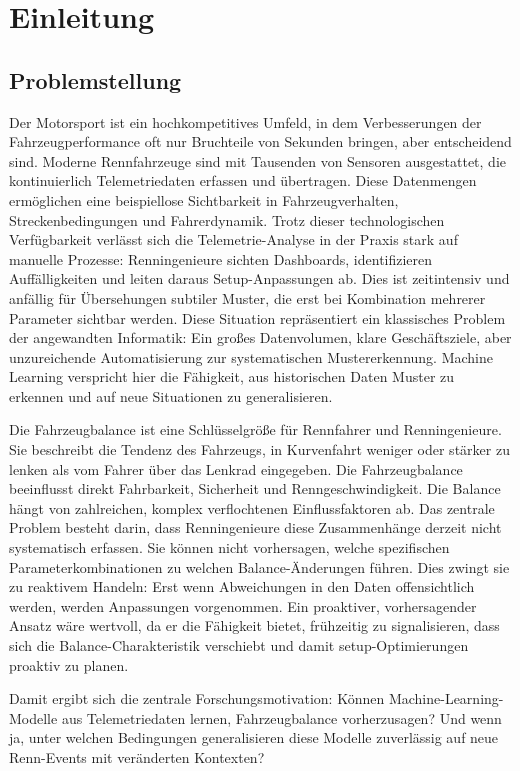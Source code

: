 \chapter{Einleitung}

\section{Problemstellung}

Der Motorsport ist ein hochkompetitives Umfeld, in dem Verbesserungen der Fahrzeugperformance oft nur Bruchteile von Sekunden bringen, aber entscheidend sind. Moderne Rennfahrzeuge sind mit Tausenden von Sensoren ausgestattet, die kontinuierlich Telemetriedaten erfassen und übertragen. Diese Datenmengen ermöglichen eine beispiellose Sichtbarkeit in Fahrzeugverhalten, Streckenbedingungen und Fahrerdynamik. Trotz dieser technologischen Verfügbarkeit verlässt sich die Telemetrie-Analyse in der Praxis stark auf manuelle Prozesse: Renningenieure sichten Dashboards, identifizieren Auffälligkeiten und leiten daraus Setup-Anpassungen ab. Dies ist zeitintensiv und anfällig für Übersehungen subtiler Muster, die erst bei Kombination mehrerer Parameter sichtbar werden.
Diese Situation repräsentiert ein klassisches Problem der angewandten Informatik: Ein großes Datenvolumen, klare Geschäftsziele, aber unzureichende Automatisierung zur systematischen Mustererkennung. Machine Learning verspricht hier die Fähigkeit, aus historischen Daten Muster zu erkennen und auf neue Situationen zu generalisieren.

Die Fahrzeugbalance ist eine Schlüsselgröße für Rennfahrer und Renningenieure. Sie beschreibt die Tendenz des Fahrzeugs, in Kurvenfahrt weniger oder stärker zu lenken als vom Fahrer über das Lenkrad eingegeben. Die Fahrzeugbalance beeinflusst direkt Fahrbarkeit, Sicherheit und Renngeschwindigkeit. Die Balance hängt von zahlreichen, komplex verflochtenen Einflussfaktoren ab.
Das zentrale Problem besteht darin, dass Renningenieure diese Zusammenhänge derzeit nicht systematisch erfassen. Sie können nicht vorhersagen, welche spezifischen Parameterkombinationen zu welchen Balance-Änderungen führen. Dies zwingt sie zu reaktivem Handeln: Erst wenn Abweichungen in den Daten offensichtlich werden, werden Anpassungen vorgenommen. Ein proaktiver, vorhersagender Ansatz wäre wertvoll, da er die Fähigkeit bietet, frühzeitig zu signalisieren, dass sich die Balance-Charakteristik verschiebt und damit setup-Optimierungen proaktiv zu planen.

Damit ergibt sich die zentrale Forschungsmotivation: Können Machine-Learning-Modelle aus Telemetriedaten lernen, Fahrzeugbalance vorherzusagen? Und wenn ja, unter welchen Bedingungen generalisieren diese Modelle zuverlässig auf neue Renn-Events mit veränderten Kontexten?

